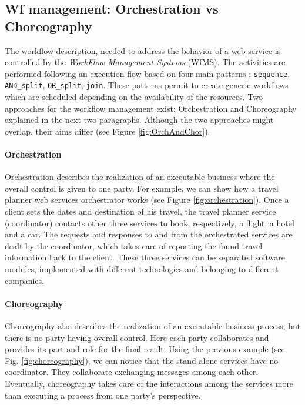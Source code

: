 \subsection{Wf management: Orchestration vs Choreography}
\label{WFManagement}
The workflow description, needed to address the behavior of a web-service is controlled by the \textit{WorkFlow Management Systems} (WfMS). The activities are performed following an execution flow based on four main patterns \cite{Pernici04}: \verb|sequence|, \verb|AND_split|, \verb|OR_split|, \verb|join|. These patterns permit to create generic workflows which are scheduled depending on the availability of the resources.
Two approaches for the workflow management exist: Orchestration and Choreography \cite{Peltz03} explained in the next two paragraphs. Although the two approaches might overlap, their aims differ (see Figure \ref{fig:OrchAndChor}). 

\paragraph{Orchestration}
Orchestration describes the realization of an executable business where the overall control is given to one party. For example, we can show how a travel planner web services orchestrator works (see Figure \ref{fig:orchestration}). Once a client sets the dates and destination of his travel, the travel planner service (coordinator) contacts other three services to book, respectively, a flight, a hotel and a car. The requests and responses to and from the orchestrated services are dealt by the coordinator, which takes care of reporting the found travel information back to the client. These three services can be separated software modules, implemented with different technologies and belonging to different companies.
\paragraph{Choreography}
Choreography also describes the realization of an executable business process, but there is no party having overall control. Here each party collaborates and provides its part and role for the final result. Using the previous example (see Fig. \ref{fig:choreography}), we can notice that the stand alone services have no coordinator. They collaborate exchanging messages among each other. Eventually, choreography takes care of the interactions among the services more than executing a process from one party's perspective.

